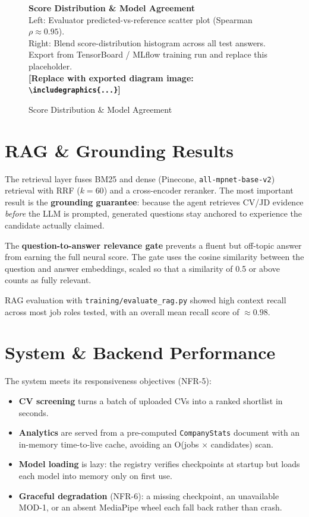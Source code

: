 \documentclass[12pt,a4paper,oneside]{report}
\newcommand{\diagramplaceholder}[1]{%
  \begin{tcolorbox}[
    colback=gray!5, colframe=gray!50,
    boxrule=0.4pt, arc=2pt,
    left=10pt, right=10pt, top=8pt, bottom=8pt,
    fontupper=\small\itshape
  ]
  \centering #1\\[4pt]
  \textbf{[Replace with exported diagram image: \texttt{\textbackslash includegraphics\{...\}}]}
  \end{tcolorbox}%
}
\begin{document}
\begin{figure}[H]
\centering
\diagramplaceholder{%
  \textbf{Score Distribution \& Model Agreement}\\
  Left: Evaluator predicted-vs-reference scatter plot (Spearman $\rho \approx 0.95$).\\
  Right: Blend score-distribution histogram across all test answers.\\
  Export from TensorBoard / MLflow training run and replace this placeholder.%
}
\caption{Score Distribution \& Model Agreement}
\label{fig:scoredist}
\end{figure}

\section{RAG \& Grounding Results}

The retrieval layer fuses BM25 and dense (Pinecone, \texttt{all-mpnet-base-v2}) retrieval with
RRF ($k = 60$) and a cross-encoder reranker. The most important result is the
\textbf{grounding guarantee}: because the agent retrieves CV/JD evidence \textit{before} the
LLM is prompted, generated questions stay anchored to experience the candidate actually
claimed.

The \textbf{question-to-answer relevance gate} prevents a fluent but off-topic answer from
earning the full neural score. The gate uses the cosine similarity between the question and
answer embeddings, scaled so that a similarity of 0.5 or above counts as fully relevant.

RAG evaluation with \texttt{training/evaluate\_rag.py} showed high context recall across most
job roles tested, with an overall mean recall score of $\approx 0.98$.

\section{System \& Backend Performance}

The system meets its responsiveness objectives (NFR-5):

\begin{itemize}
  \item \textbf{CV screening} turns a batch of uploaded CVs into a ranked shortlist in seconds.
  \item \textbf{Analytics} are served from a pre-computed \texttt{CompanyStats} document with
    an in-memory time-to-live cache, avoiding an O(jobs $\times$ candidates) scan.
  \item \textbf{Model loading} is lazy: the registry verifies checkpoints at startup but loads
    each model into memory only on first use.
  \item \textbf{Graceful degradation} (NFR-6): a missing checkpoint, an unavailable MOD-1, or
    an absent MediaPipe wheel each fall back rather than crash.
\end{itemize}
\end{document}
